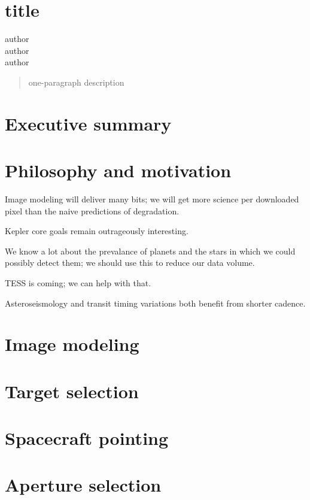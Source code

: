 \documentclass[12pt]{article}
\begin{document}
\section*{title}
\noindent
author \\
author \\
author

\begin{abstract}
one-paragraph description
\end{abstract}

\clearpage

\section{Executive summary}

\section{Philosophy and motivation}

Image modeling will deliver many bits; we will get more science per
downloaded pixel than the naive predictions of degradation.

Kepler core goals remain outrageously interesting.

We know a lot about the prevalance of planets and the stars in which
we could possibly detect them; we should use this to reduce our data
volume.

TESS is coming; we can help with that.

Asteroseismology and transit timing variations both benefit from
shorter cadence.

\section{Image modeling}

\section{Target selection}

\section{Spacecraft pointing}

\section{Aperture selection}
\end{document}

